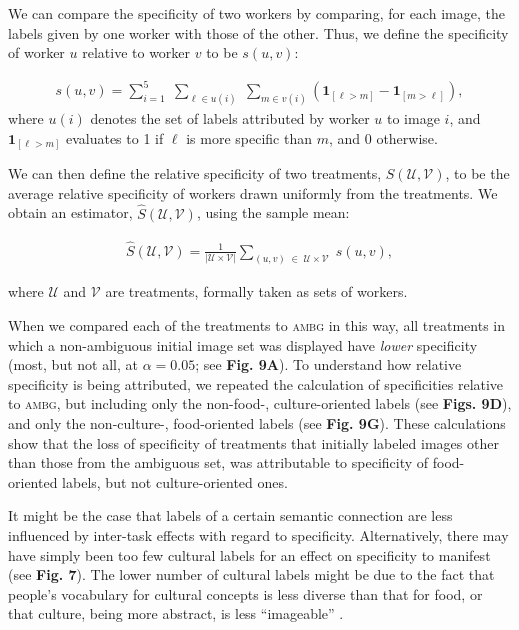 \documentclass[a4paper]{report}
\begin{document}
We can compare the specificity of two workers by comparing, for each image,
the labels given by one worker with those of the other.  Thus, we define the
specificity of worker $u$ relative to worker $v$ to be $s(u,v)$:

\begin{align}
	s(u,v) = \sum_{i=1}^5 \;
	\sum_{\ell \in u(i) } \;
	\sum_{m \in v(i)} 
	\left(\mathbf{1}_{[\ell > m]} - \mathbf{1}_{[m>\ell]}\right),
	\label{eq:worker-specificity}
\end{align}
where $u(i)$ denotes the set of labels attributed by worker $u$ to image $i$, 
and $\mathbf{1}_{[\ell > m]}$ evaluates to 1 if $\ell$ is more specific than 
$m$, and 0 otherwise.

We can then define the relative specificity of two treatments, 
$S(\mathcal{U},\mathcal{V})$, to be the average
relative specificity of workers drawn uniformly from the treatments.  
We obtain an estimator, $\hat{S}({\mathcal{U}, \mathcal{V}})$, using the 
sample mean:

\begin{align}
	\hat{S}(\mathcal{U},\mathcal{V}) = 
	\frac{1}{|\mathcal{U} \times \mathcal{V}|}
	\sum_{(u,v) \; \in \; \mathcal{U} \times \mathcal{V}} \;
		s(u,v),
		\label{eq:specificity}
\end{align}

where $\mathcal{U}$ and $\mathcal{V}$ are treatments, formally taken
as sets of workers.

When we compared each of the treatments to \textsc{ambg} in this way, 
all treatments in which a non-ambiguous initial image set was 
displayed have \textit{lower} specificity 
(most, but not all, at $\alpha=0.05$; see \textbf{Fig. 9A}).  To understand
how relative specificity is being attributed, we repeated the calculation of 
specificities relative to \textsc{ambg}, but including only the non-food-, culture-oriented 
labels (see \textbf{Figs. 9D}), and only the non-culture-, food-oriented labels
(see \textbf{Fig. 9G}).  These calculations show that the loss of 
specificity of treatments that initially labeled images other than those from
the ambiguous set, was attributable to specificity of food-oriented labels, 
but not culture-oriented ones.  

It might be the case that labels of a certain semantic connection are less 
influenced by inter-task effects with regard to specificity. Alternatively,
there may have simply been too few cultural labels for an effect on specificity
to manifest (see \textbf{Fig. 7}).
The lower number of cultural labels might be due to the fact that people's 
vocabulary for cultural concepts is less diverse than that for food, or that 
culture, being more abstract, is less ``imageable'' \cite{Swaab200299}.
\end{document}
